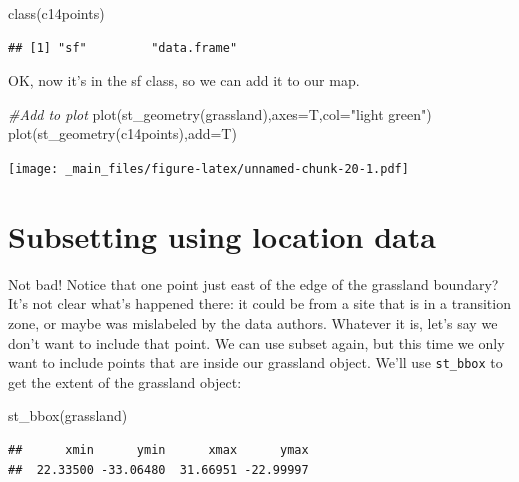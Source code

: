 \documentclass[
]{book}
\newenvironment{Shaded}{\begin{snugshade}}{\end{snugshade}}
\newcommand{\AttributeTok}[1]{\textcolor[rgb]{0.77,0.63,0.00}{#1}}
\newcommand{\CommentTok}[1]{\textcolor[rgb]{0.56,0.35,0.01}{\textit{#1}}}
\newcommand{\FunctionTok}[1]{\textcolor[rgb]{0.00,0.00,0.00}{#1}}
\newcommand{\NormalTok}[1]{#1}
\newcommand{\StringTok}[1]{\textcolor[rgb]{0.31,0.60,0.02}{#1}}
\begin{document}
\begin{Shaded}
\begin{Highlighting}[]
\FunctionTok{class}\NormalTok{(c14points)}
\end{Highlighting}
\end{Shaded}

\begin{verbatim}
## [1] "sf"         "data.frame"
\end{verbatim}

OK, now it's in the sf class, so we can add it to our map.

\begin{Shaded}
\begin{Highlighting}[]
\CommentTok{\#Add to plot}
\FunctionTok{plot}\NormalTok{(}\FunctionTok{st\_geometry}\NormalTok{(grassland),}\AttributeTok{axes=}\NormalTok{T,}\AttributeTok{col=}\StringTok{"light green"}\NormalTok{)}
\FunctionTok{plot}\NormalTok{(}\FunctionTok{st\_geometry}\NormalTok{(c14points),}\AttributeTok{add=}\NormalTok{T)}
\end{Highlighting}
\end{Shaded}

\texttt{[image: \_main\_files/figure-latex/unnamed-chunk-20-1.pdf]}

\hypertarget{subsetting-using-location-data}{%
\section{Subsetting using location data}\label{subsetting-using-location-data}}

Not bad! Notice that one point just east of the edge of the grassland boundary? It's not clear what's happened there: it could be from a site that is in a transition zone, or maybe was mislabeled by the data authors. Whatever it is, let's say we don't want to include that point. We can use subset again, but this time we only want to include points that are inside our grassland object. We'll use \texttt{st\_bbox} to get the extent of the grassland object:

\begin{Shaded}
\begin{Highlighting}[]
\FunctionTok{st\_bbox}\NormalTok{(grassland)}
\end{Highlighting}
\end{Shaded}

\begin{verbatim}
##      xmin      ymin      xmax      ymax 
##  22.33500 -33.06480  31.66951 -22.99997
\end{verbatim}
\end{document}
